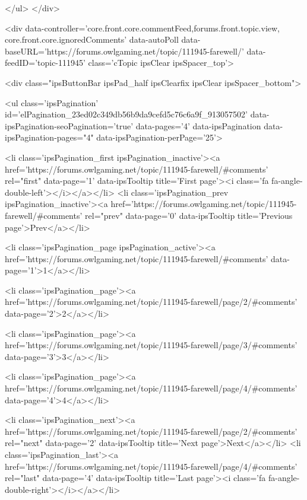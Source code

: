 	</ul>
</div>

<div data-controller='core.front.core.commentFeed,forums.front.topic.view, core.front.core.ignoredComments' data-autoPoll data-baseURL='https://forums.owlgaming.net/topic/111945-farewell/'  data-feedID='topic-111945' class='cTopic ipsClear ipsSpacer_top'>
	
		

				<div class="ipsButtonBar ipsPad_half ipsClearfix ipsClear ipsSpacer_bottom">
					
					
						


	
	<ul class='ipsPagination' id='elPagination_23ed02c349db56b9da9cefd5c76c6a9f_913057502' data-ipsPagination-seoPagination='true' data-pages='4' data-ipsPagination  data-ipsPagination-pages="4" data-ipsPagination-perPage='25'>
		
			
				<li class='ipsPagination_first ipsPagination_inactive'><a href='https://forums.owlgaming.net/topic/111945-farewell/#comments' rel="first" data-page='1' data-ipsTooltip title='First page'><i class='fa fa-angle-double-left'></i></a></li>
				<li class='ipsPagination_prev ipsPagination_inactive'><a href='https://forums.owlgaming.net/topic/111945-farewell/#comments' rel="prev" data-page='0' data-ipsTooltip title='Previous page'>Prev</a></li>
			
			<li class='ipsPagination_page ipsPagination_active'><a href='https://forums.owlgaming.net/topic/111945-farewell/#comments' data-page='1'>1</a></li>
			
				
					<li class='ipsPagination_page'><a href='https://forums.owlgaming.net/topic/111945-farewell/page/2/#comments' data-page='2'>2</a></li>
				
					<li class='ipsPagination_page'><a href='https://forums.owlgaming.net/topic/111945-farewell/page/3/#comments' data-page='3'>3</a></li>
				
					<li class='ipsPagination_page'><a href='https://forums.owlgaming.net/topic/111945-farewell/page/4/#comments' data-page='4'>4</a></li>
				
				<li class='ipsPagination_next'><a href='https://forums.owlgaming.net/topic/111945-farewell/page/2/#comments' rel="next" data-page='2' data-ipsTooltip title='Next page'>Next</a></li>
				<li class='ipsPagination_last'><a href='https://forums.owlgaming.net/topic/111945-farewell/page/4/#comments' rel="last" data-page='4' data-ipsTooltip title='Last page'><i class='fa fa-angle-double-right'></i></a></li>
			
